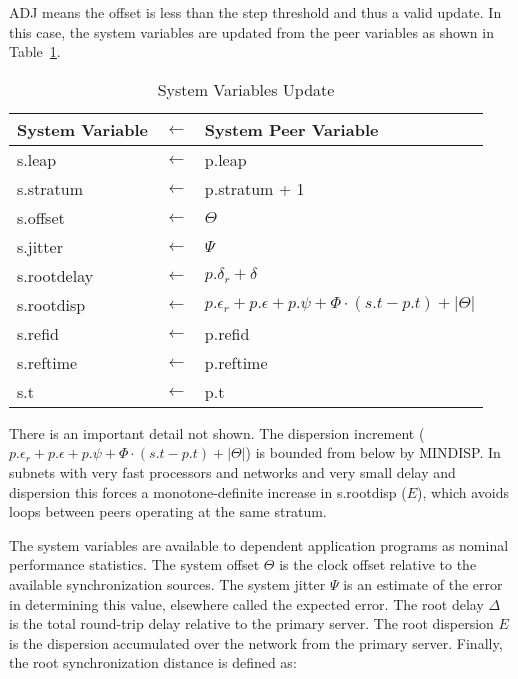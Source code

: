 ADJ means the offset is less than the step threshold and thus a valid
update. In this case, the system variables are updated from the peer
variables as shown in Table~\ref{system_variables_update}.

\begin{table}[htb]
  \center
  \begin{tabular}{| l c l |}
    \hline
    System Variable & $ \leftarrow $ & System Peer Variable \\
    \hline
    \hline
    s.leap      & $ \leftarrow $ & p.leap                    \\
    s.stratum   & $ \leftarrow $ & p.stratum + 1             \\
    s.offset    & $ \leftarrow $ & $ \Theta $                     \\
    s.jitter    & $ \leftarrow $ & $ \Psi $                       \\
    s.rootdelay & $ \leftarrow $ & $ p.\delta_r + \delta $         \\
    s.rootdisp  & $ \leftarrow $ & $ p.\epsilon_r + p.\epsilon + p.\psi + \Phi \cdot (s.t - p.t) + |\Theta| $ \\
    s.refid     & $ \leftarrow $ & p.refid                   \\
    s.reftime   & $ \leftarrow $ & p.reftime                 \\
    s.t         & $ \leftarrow $ & p.t                       \\
    \hline
  \end{tabular}
  \caption{System Variables Update}
  \label{system_variables_update}
\end{table}

There is an important detail not shown. The dispersion increment
($ p.\epsilon_r + p.\epsilon + p.\psi + \Phi \cdot (s.t - p.t) + |\Theta| $) is bounded from
below by MINDISP. In subnets with very fast processors and networks
and very small delay and dispersion this forces a monotone-definite
increase in s.rootdisp ($ E $), which avoids loops between peers
operating at the same stratum.

The system variables are available to dependent application programs
as nominal performance statistics. The system offset $ \Theta $ is the
clock offset relative to the available synchronization sources. The
system jitter $ \Psi $ is an estimate of the error in determining this
value, elsewhere called the expected error. The root delay $ \Delta $ is
the total round-trip delay relative to the primary server. The root
dispersion $ E $ is the dispersion accumulated over the network
from the primary server. Finally, the root synchronization distance
is defined as:

